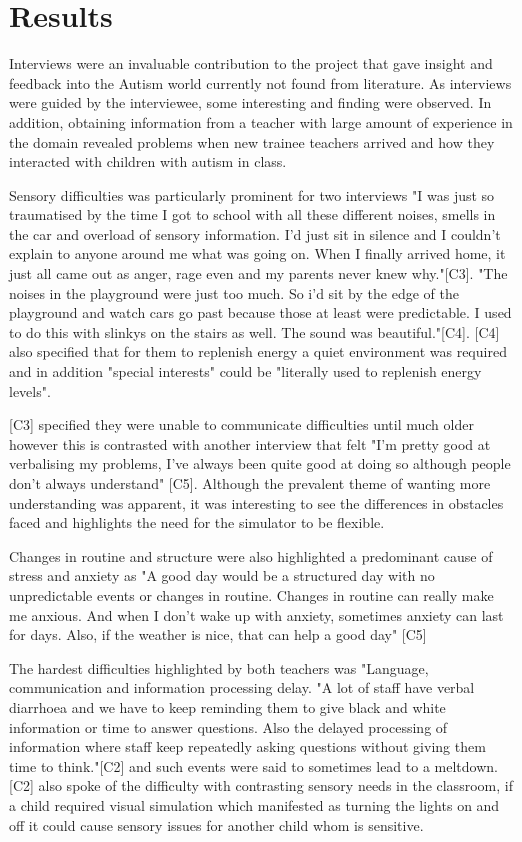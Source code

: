 \documentclass[11pt]{report}
\begin{document}
\section{Results}
Interviews were an invaluable contribution to the project that gave insight and feedback into the Autism world currently not found from literature. As interviews were guided by the interviewee, some interesting and finding were observed. In addition, obtaining information from a teacher with large amount of experience in the domain revealed problems when new trainee teachers arrived and how they interacted with children with autism in class.  

Sensory difficulties was particularly prominent for two interviews "I was just so traumatised by the time I got to school with all these different noises, smells in the car and overload of sensory information. I’d just sit in silence and I couldn’t explain to anyone around me what was going on. When I finally arrived home, it just all came out as anger, rage even and my parents never knew why."[C3]. "The noises in the playground were just too much. So i’d sit by the edge of the playground and watch cars go past because those at least were predictable. I used to do this with slinkys on the stairs as well. The sound was beautiful."[C4]. [C4] also specified that for them to replenish energy a quiet environment was required and in addition "special interests" could be "literally used to replenish energy levels". 

[C3] specified they were unable to communicate difficulties until much older however this is contrasted with another interview that felt "I'm pretty good at verbalising my problems, I've always been quite good at doing so although people don't always understand" [C5]. Although the prevalent theme of wanting more understanding was apparent, it was interesting to see the differences in obstacles faced and highlights the need for the simulator to be flexible. 

Changes in routine and structure were also highlighted a predominant cause of stress and anxiety as "A good day would be a structured day with no unpredictable events or changes in routine. Changes in routine can really make me anxious. And when I don't wake up with anxiety, sometimes anxiety can last for days. Also, if the weather is nice, that can help a good day" [C5]

The hardest difficulties highlighted by both teachers was "Language, communication and information processing delay. "A lot of staff have verbal diarrhoea and we have to keep reminding them to give black and white information or time to answer questions. Also the delayed processing of information where staff keep repeatedly asking questions without giving them time to think."[C2] and such events were said to sometimes lead to a meltdown. [C2] also spoke of the difficulty with contrasting sensory needs in the classroom, if a child required visual simulation which manifested as turning the lights on and off it could cause sensory issues for another child whom is sensitive. 
\end{document}
